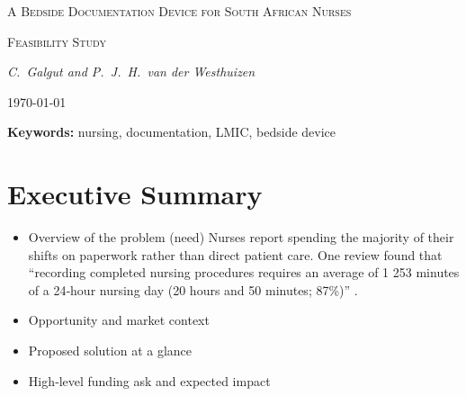 \documentclass[a4paper,11pt]{article}
\begin{document}
\begin{titlepage}
  \centering
  \vspace*{1cm}
  {\scshape\LARGE A Bedside Documentation Device for South African Nurses\par}
  \vspace{1cm}
  {\scshape\Large Feasibility Study\par}
  \vfill
  {\Large\itshape C.\ Galgut and P.\ J.\ H.\ van der Westhuizen\par}
  \vspace{2cm}
  {\large \today\par}
\end{titlepage}

\newpage
\begin{abstract}
\end{abstract}

\textbf{Keywords:} nursing, documentation, LMIC, bedside device

\newpage
\tableofcontents
\listoftables
\listoffigures

\newpage
{}

\section{Executive Summary}
\begin{itemize}
  \item Overview of the problem (need)
    Nurses report spending the majority of their shifts on paperwork rather than direct patient care. One review found that “recording completed nursing procedures requires an average of 1 253 minutes of a 24‑hour nursing day (20 hours and 50 minutes; 87\%)” \cite{olivierRecordKeepingSelfreported2010}.
  \item Opportunity and market context
  \item Proposed solution at a glance
  \item High‑level funding ask and expected impact
\end{itemize}
\end{document}
